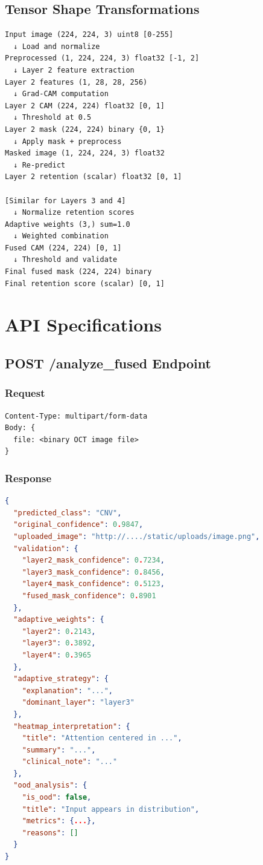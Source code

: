 \documentclass[12pt,a4paper,oneside]{book}
\begin{document}
\subsection{Tensor Shape Transformations}

\begin{lstlisting}
Input image (224, 224, 3) uint8 [0-255]
  ↓ Load and normalize
Preprocessed (1, 224, 224, 3) float32 [-1, 2]
  ↓ Layer 2 feature extraction
Layer 2 features (1, 28, 28, 256)
  ↓ Grad-CAM computation
Layer 2 CAM (224, 224) float32 [0, 1]
  ↓ Threshold at 0.5
Layer 2 mask (224, 224) binary {0, 1}
  ↓ Apply mask + preprocess
Masked image (1, 224, 224, 3) float32
  ↓ Re-predict
Layer 2 retention (scalar) float32 [0, 1]

[Similar for Layers 3 and 4]
  ↓ Normalize retention scores
Adaptive weights (3,) sum=1.0
  ↓ Weighted combination
Fused CAM (224, 224) [0, 1]
  ↓ Threshold and validate
Final fused mask (224, 224) binary
Final retention score (scalar) [0, 1]
\end{lstlisting}

\section{API Specifications}

\subsection{POST /analyze\_fused Endpoint}

\subsubsection{Request}

\begin{lstlisting}
Content-Type: multipart/form-data
Body: {
  file: <binary OCT image file>
}
\end{lstlisting}

\subsubsection{Response}

\begin{lstlisting}[language=JSON]
{
  "predicted_class": "CNV",
  "original_confidence": 0.9847,
  "uploaded_image": "http://..../static/uploads/image.png",
  "validation": {
    "layer2_mask_confidence": 0.7234,
    "layer3_mask_confidence": 0.8456,
    "layer4_mask_confidence": 0.5123,
    "fused_mask_confidence": 0.8901
  },
  "adaptive_weights": {
    "layer2": 0.2143,
    "layer3": 0.3892,
    "layer4": 0.3965
  },
  "adaptive_strategy": {
    "explanation": "...",
    "dominant_layer": "layer3"
  },
  "heatmap_interpretation": {
    "title": "Attention centered in ...",
    "summary": "...",
    "clinical_note": "..."
  },
  "ood_analysis": {
    "is_ood": false,
    "title": "Input appears in distribution",
    "metrics": {...},
    "reasons": []
  }
}
\end{lstlisting}
\end{document}
